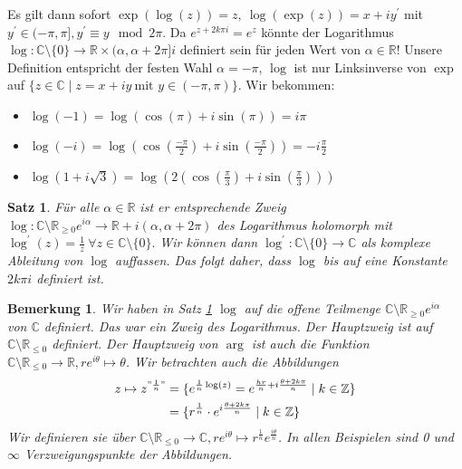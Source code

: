 \documentclass[a4paper,12pt]{book}
\theoremstyle{newthm}
\newtheorem{thm}{Satz}[section]
\theoremstyle{newdef}
\theoremstyle{newrem}
\newtheorem*{rem}{Bemerkung}
\newcommand{\Z}{\mathbb{Z}}
\newcommand{\R}{\mathbb{R}}
\newcommand{\C}{\mathbb{C}}
\begin{document}
		Es gilt dann sofort $ \exp(\log(z)) = z,\ \log(\exp(z)) = x+iy^\prime $ mit $ y^\prime \in (-\pi,\pi], y^\prime \equiv y \mod 2\pi. $ Da $ e^{z+2k\pi i} = e^z $ könnte der Logarithmus $ \log: \C \setminus\{0\} \to \R \times (\alpha,\alpha + 2 \pi] i $ definiert sein für jeden Wert von $ \alpha \in \R $! Unsere Definition entspricht der festen Wahl $ \alpha = -\pi $, $\log$ ist nur Linksinverse von $\exp$ auf $ \{ z \in \C \mid z=x+iy\ \text{mit } y \in (-\pi,\pi) \} $. Wir bekommen:
		\begin{itemize}
			\item $ \log(-1) = \log(\cos(\pi) + i\sin(\pi)) = i\pi $
			\item $ \log(-i) = \log\left( \cos \left( \frac{-\pi}{2} \right) + i \sin \left( \frac{-\pi}{2} \right) \right) = -i \frac{\pi}{2} $
			\item $ \log(1+i\sqrt{3}) = \log\left(2\left(\cos \left( \frac{\pi}{3} \right) + i \sin \left( \frac{\pi}{3} \right)\right)\right) $
		\end{itemize}
		
		\begin{thm}\label{thm_logdiff}
			Für alle $ \alpha \in \R $ ist er entsprechende Zweig $ \log: \C \setminus \R_{\geq 0} e^{i\alpha} \to \R + i(\alpha,\alpha + 2\pi) $ des Logarithmus holomorph mit $ \log^\prime(z) = \frac{1}{z}\ \forall z \in \C \setminus \{0\}. $ Wir können dann $ \log^\prime: \C\setminus\{0\} \to \C $ als komplexe Ableitung von $\log$ auffassen. Das folgt daher, dass $\log$ bis auf eine Konstante $ 2k\pi i $ definiert ist.
		\end{thm}
		
		\begin{rem}
			Wir haben in Satz \ref{thm_logdiff} $\log$ auf die offene Teilmenge $ \C \setminus \R_{\geq 0} e^{i\alpha} $ von $\C$ definiert. Das war ein \emph{Zweig} des Logarithmus. Der Hauptzweig ist auf $\C \setminus \R_{\leq 0}$ definiert. Der Hauptzweig von $\arg$ ist auch die Funktion $ \C \setminus \R_{\leq 0} \to \R, re^{i\theta} \mapsto \theta $. Wir betrachten auch die Abbildungen
			\begin{align*}
				z \mapsto z^{"\frac{1}{n}"} &= \{ e^{\frac{1}{n}\log(z)} = e^{\frac{hr}{n} + i \frac{\theta + 2k\pi}{n}} \mid k \in \Z \}\\
				&= \{ r^\frac{1}{n} \cdot e^{i \frac{\theta + 2k\pi}{n}} \mid k \in \Z \}
			\end{align*}
			Wir definieren sie über $ \C \setminus \R_{\leq 0} \to \C, re^{i\theta} \mapsto r^\frac{1}{n} e^\frac{i\theta}{n} $. In allen Beispielen sind 0 und $\infty$ \emph{Verzweigungspunkte} der Abbildungen.
		\end{rem}
	
\end{document}
